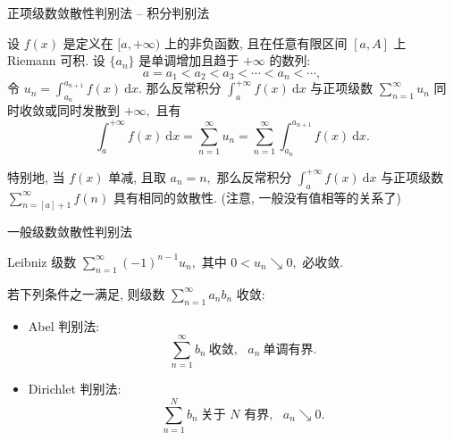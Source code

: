 
\begin{frame}{正项级数敛散性判别法 -- 积分判别法}

设 $f(x)$ 是定义在 $[a, +\infty)$ 上的非负函数, 且在任意有限区间 $[a, A]$ 上 Riemann 可积. 设 $\{a_n\}$ 是单调增加且趋于 $+\infty$ 的数列:
\[a = a_1 < a_2 < a_3 < \cdots < a_n < \cdots,\]
令 $u_n = \int_{a_n}^{a_{n+1}} f(x) ~ \mathrm{d} x.$ 那么反常积分 $\int_a^{+\infty} f(x) ~ \mathrm{d} x$ 与正项级数 $\sum\limits_{n=1}^\infty u_n$ 同时收敛或同时发散到 $+\infty,$ 且有
\vspace{-1em}
\[\int_a^{+\infty} f(x) ~ \mathrm{d} x = \sum\limits_{n=1}^\infty u_n = \sum\limits_{n=1}^\infty \int_{a_n}^{a_{n+1}} f(x) ~ \mathrm{d} x.\]

\pause

特别地, 当 $f(x)$ 单减, 且取 $a_n = n,$ 那么反常积分 $\int_a^{+\infty} f(x) ~ \mathrm{d} x$ 与正项级数$\sum\limits_{n=[a]+1}^\infty f(n)$ 具有相同的敛散性. (注意, 一般没有值相等的关系了)

\end{frame}


\begin{frame}{一般级数敛散性判别法}

\begin{thm}
Leibniz 级数 $\sum\limits_{n=1}^\infty (-1)^{n-1} u_n,$ 其中 $0 < u_n \searrow 0,$ 必收敛.
\end{thm}

\pause

\begin{thm}[A-D 判别法]
若下列条件之一满足, 则级数 $\sum\limits_{n=1}^{\infty} a_n b_n$ 收敛:
\begin{itemize}[<+->]
\item Abel 判别法:
\[\sum\limits_{n=1}^{\infty} b_n ~ \text{收敛}, ~~~ a_n ~ \text{单调有界}.\]
\item Dirichlet 判别法:
\[\sum\limits_{n=1}^{N} b_n ~ \text{关于 $N$ 有界}, ~~~ a_n \searrow 0.\]
\end{itemize}
\end{thm}

\end{frame}


